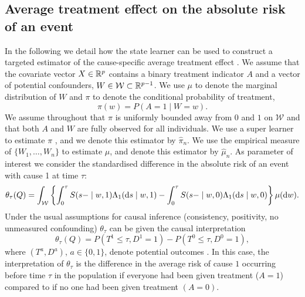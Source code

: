 \subsection{Average treatment effect on the absolute risk of an event}
\label{sec:cause-spec-aver}

In the following we detail how the state learner can be used to
construct a targeted estimator of the cause-specific average treatment
effect \citep{rytgaard2022targeted}. We assume that the covariate
vector \( X \in \mathbb{R}^p \) contains a binary treatment indicator \( A \)
and a vector of potential confounders,
\( W \in \mathcal{W}\subset \mathbb{R}^{p-1} \).  We use $\mu$ to denote the
marginal distribution of \( W \) and $\pi$ to denote the conditional
probability of treatment,
\begin{equation*}
  \pi(w) = P(A=1 \mid W=w).
\end{equation*}
We assume throughout that $\pi$ is uniformly bounded away from \( 0 \)
and \( 1 \) on \( \mathcal{W} \) and that both \( A \) and \( W \) are
fully observed for all individuals. We use a super learner to
estimate $\pi$ \citep{Polley_Ledell_Kennedy_Laan_2023_Superlearn}, and
we denote this estimator by $\hat{\pi}_n$. We use the empirical
measure of \( \{W_1, \dots, W_n\} \) to estimate $\mu$, and denote
this estimator by $\hat{\mu}_n$. As parameter of interest we consider
the standardised difference in the absolute risk of an event with
cause 1 at time $\tau$:
\begin{equation*}
  \theta_{{\tau}}(Q) = \int_{\mathcal{W}} 
  \left\{
    \int_0^{\tau}
    S(s- \mid w, 1)  \Lambda_1(\mathop{}\!\mathrm{d} s \mid w, 1)
    -
    \int_0^{\tau}
    S(s- \mid w, 0)  \Lambda_1(\mathop{}\!\mathrm{d} s \mid w, 0)
  \right\}
  \mu(\mathop{}\!\mathrm{d} w).
\end{equation*}
Under the usual assumptions for causal inference (consistency,
positivity, no unmeasured confounding) \( \theta_{{\tau}} \) can be
given the causal interpretation
\begin{equation*}
  \theta_{{\tau}}(Q) =
  P{(T^{1} \leq \tau, D^{1}=1)}-
  P{(T^{0} \leq \tau, D^{0}=1)},
\end{equation*}
where \( (T^a, D^a) \), \( a \in \{0,1\} \), denote potential outcomes
\citep{hernanRobinsWhatIf}. In this case, the interpretation of $\theta_{\tau}$
is the difference in the average risk of cause \( 1 \) occurring before time
\( \tau \) in the population if everyone had been given treatment (\( A=1 \))
compared to if no one had been given treatment \( (A=0) \).

